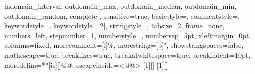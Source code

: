 {{  indomain_interval, outdomain_max, outdomain_median, outdomain_min,
  outdomain_random, complete
  },
  sensitive=true,
  basicstyle=\mznfont,
  commentstyle=\color[rgb]{0.9,0.1,0.1},
  keywordstyle=\color[rgb]{0,0.5,0},
  keywordstyle=[2]\color{blue},
  stringstyle=\color{orange},
  tabsize=2,
  frame=none,
  numbers=left,
  stepnumber=1,
  numberstyle=\tiny,
  numbersep=5pt,
  xleftmargin=0pt, %
  columns=fixed, %
  morecomment=[l]{\%},
  morestring=[b]",
  showstringspaces=false,
  mathescape=true,
  breaklines=true,
  breakatwhitespace=true,
  breakindent=10pt, %
  moredelim=**[is][\color{Melon}]{@}{@},
  escapeinside={{<@}{@>}}
}
[1][]{\lstset{language=Mzn,#1}}{}
[1][]{\lstset{language=Mzn,numbers=none,xleftmargin=0pt,#1}}{}
\newcommand{\mzninline}[1]{\lstinline[{language=Mzn}]|#1|}
\newcommand{\mzninlinebar}[1]{\lstinline[{language=Mzn}]!#1!}
